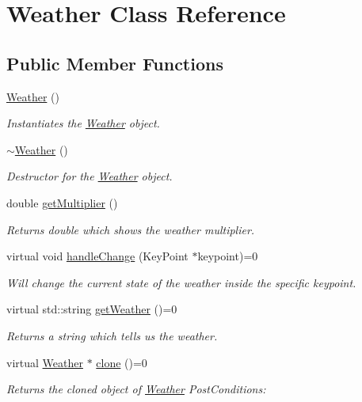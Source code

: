 \hypertarget{classWeather}{}\section{Weather Class Reference}
\label{classWeather}
\subsection*{Public Member Functions}
\begin{DoxyCompactItemize}
\item 
\mbox{\label{classWeather_aa404c94fec05b825454a7309827767c6}} 
\hyperlink{classWeather_aa404c94fec05b825454a7309827767c6}{Weather} ()
\begin{DoxyCompactList}\small\item\em Instantiates the \hyperlink{classWeather}{Weather} object. \end{DoxyCompactList}\item 
\mbox{\label{classWeather_a6cc4f6ce440531f5c882547dcf40eb22}} 
\hyperlink{classWeather_a6cc4f6ce440531f5c882547dcf40eb22}{$\sim$\+Weather} ()
\begin{DoxyCompactList}\small\item\em Destructor for the \hyperlink{classWeather}{Weather} object. \end{DoxyCompactList}\item 
double \hyperlink{classWeather_a608d4dbf5437b576d131fe92bf8b81d7}{get\+Multiplier} ()
\begin{DoxyCompactList}\small\item\em Returns double which shows the weather multiplier. \end{DoxyCompactList}\item 
virtual void \hyperlink{classWeather_afc84c48c326fc967915833e689bfa40c}{handle\+Change} (Key\+Point $\ast$keypoint)=0
\begin{DoxyCompactList}\small\item\em Will change the current state of the weather inside the specific keypoint. \end{DoxyCompactList}\item 
virtual std\+::string \hyperlink{classWeather_ad0a29227308b87e98808cdff52232df3}{get\+Weather} ()=0
\begin{DoxyCompactList}\small\item\em Returns a string which tells us the weather. \end{DoxyCompactList}\item 
virtual \hyperlink{classWeather}{Weather} $\ast$ \hyperlink{classWeather_a7d902c27129b9191f72be837dd66fa83}{clone} ()=0
\begin{DoxyCompactList}\small\item\em Returns the cloned object of \hyperlink{classWeather}{Weather} Post\+Conditions\+: \end{DoxyCompactList}\end{DoxyCompactItemize}
